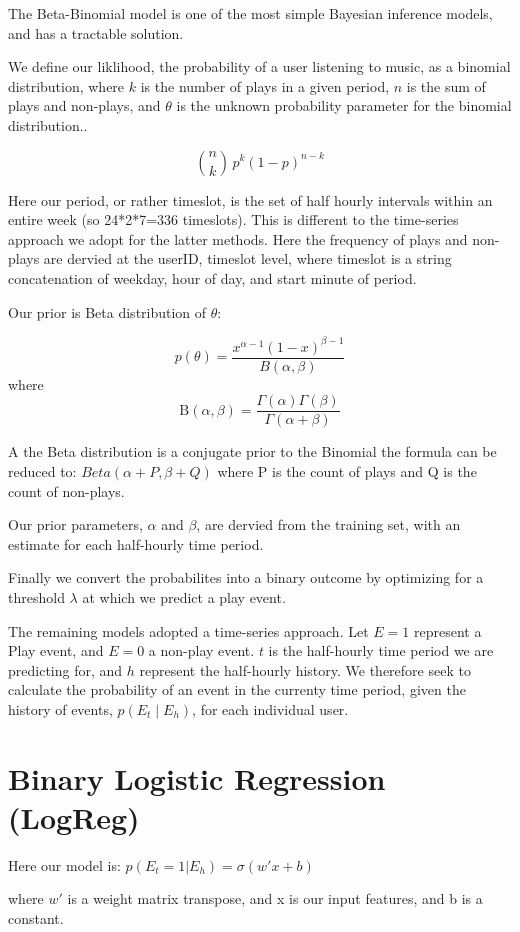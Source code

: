 The Beta-Binomial model is one of the most simple Bayesian inference models, and has a tractable solution.

We define our liklihood, the probability of a user listening to music, as a binomial distribution, where $k$ is the number of plays in a given period, $n$ is the sum of plays and non-plays, and $\theta$ is the unknown probability parameter for the binomial distribution.. 

$${n \choose k}\,p^{k}(1-p)^{n-k}$$

Here our period, or rather timeslot, is the set of half hourly intervals within an entire week (so 24*2*7=336 timeslots). This is different to the time-series approach we adopt for the latter methods. Here the frequency of plays and non-plays are dervied at the userID, timeslot level, where timeslot is a string concatenation of weekday, hour of day, and start minute of period. 

Our prior is Beta distribution of $\theta$:

$$p(\theta)=\frac{x^{\alpha-1}(1-x)^{\beta-1}} {B(\alpha,\beta)}$$ where
$$\mathrm {B} (\alpha ,\beta )={\frac {\Gamma (\alpha )\Gamma (\beta )}{\Gamma (\alpha +\beta )}}$$

A the Beta distribution is a conjugate prior to the Binomial the formula can be reduced to: $Beta(\alpha+P, \beta+Q)$ where P is the count of plays and Q is the count of non-plays.

Our prior parameters, $\alpha$ and $\beta$, are dervied from the training set, with an estimate for each half-hourly time period. 

Finally we convert the probabilites into a binary outcome by optimizing for a threshold $\lambda$ at which we predict a play event.

The remaining models adopted a time-series approach. Let $E = 1$ represent a Play event, and $E = 0$ a non-play event. $t$ is the half-hourly time period we are predicting for, and $h$ represent the half-hourly history. We therefore seek to calculate the probability of an event in the currenty time period, given the history of events, $p(E_t \mid E_h)$, for each individual user. 

\section{Binary Logistic Regression (LogReg)}

Here our model is:
$p(E_t = 1 | E_h) =  \sigma(w'x + b)$

where $w'$ is a weight matrix transpose, and x is our input features, and b is a constant. 

